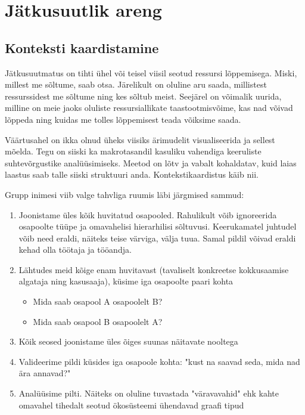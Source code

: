 \chapter{Jätkusuutlik areng}
\section{Konteksti kaardistamine}
Jätkusuutmatus on tihti ühel või teisel viisil seotud ressursi lõppemisega. Miski, millest me sõltume, saab otsa. Järelikult on oluline aru saada, millistest ressurssidest me sõltume ning kes sõltub meist. Seejärel on võimalik uurida, milline on meie jaoks oluliste ressursiallikate taastootmisvõime, kas nad võivad lõppeda ning kuidas me tolles lõppemisest teada võiksime saada.

Väärtusahel on ikka olnud üheks viisiks ärimudelit visualiseerida ja sellest mõelda. Tegu on siiski ka makrotasandil kasuliku vahendiga keeruliste suhtevõrgustike analüüsimiseks. Meetod on lõtv ja vabalt kohaldatav, kuid laias laastus saab talle siiski struktuuri anda. Kontekstikaardistus käib nii. 

Grupp inimesi viib valge tahvliga ruumis läbi järgmised sammud:
\begin{enumerate}
	\item Joonistame üles kõik huvitatud osapooled. Rahulikult võib ignoreerida osapoolte tüüpe ja omavahelisi hierarhilisi sõltuvusi. Keerukamatel juhtudel võib need eraldi, näiteks teise värviga, välja tuua. Samal pildil võivad eraldi kehad olla töötaja ja tööandja. 
	\item Lähtudes meid kõige enam huvitavast (tavaliselt konkreetse kokkusaamise algataja ning kasusaaja), küsime iga osapoolte paari kohta
		\begin{itemize}
			\item Mida saab osapool A osapoolelt B?
			\item Mida saab osapool B osapoolelt A?
		\end{itemize}
	\item Kõik seosed joonistame üles õiges suunas näitavate nooltega 
	\item Valideerime pildi küsides iga osapoole kohta: "kust na saavad seda, mida nad ära annavad?"
	\item Analüüsime pilti. Näiteks on oluline tuvastada "väravavahid" ehk kahte omavahel tihedalt seotud ökosüsteemi ühendavad graafi tipud
\end{enumerate}

